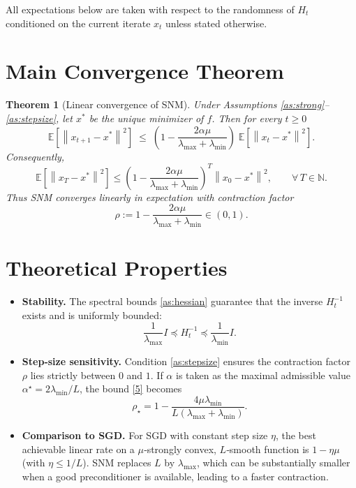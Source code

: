 \documentclass{article}
\newtheorem{theorem}{Theorem}
\newcommand{\E}{\mathbb{E}}
\newcommand{\norm}[1]{\left\|#1\right\|}
\begin{document}
All expectations below are taken with respect to the randomness of
$H_t$ conditioned on the current iterate $x_t$ unless stated otherwise.

\section*{Main Convergence Theorem}
\begin{theorem}[Linear convergence of SNM]
\label{thm:linear}
Under Assumptions \ref{as:strong}–\ref{as:stepsize},
let $x^{*}$ be the unique minimizer of $f$.  Then for every $t\ge0$
\[
\E\!\left[\norm{x_{t+1}-x^{*}}^{2}\right]
\;\le\;
\left(1-\frac{2\alpha\mu}{\lambda_{\max}+\lambda_{\min}}\right)
\;\E\!\left[\norm{x_{t}-x^{*}}^{2}\right].
\tag{5}
\]
Consequently,
\[
\E\!\left[\norm{x_{T}-x^{*}}^{2}\right]
\le
\left(1-\frac{2\alpha\mu}{\lambda_{\max}+\lambda_{\min}}\right)^{\!T}
\norm{x_{0}-x^{*}}^{2},
\qquad
\forall\,T\in\mathbb{N}.
\tag{6}
\]
Thus SNM converges \emph{linearly} in expectation with contraction factor
\[
\rho:=1-\frac{2\alpha\mu}{\lambda_{\max}+\lambda_{\min}}
\in (0,1).
\]
\end{theorem}

\section*{Theoretical Properties}
\begin{itemize}
\item \textbf{Stability.}  The spectral bounds \eqref{as:hessian} guarantee that
the inverse $H_t^{-1}$ exists and is uniformly bounded:
\[
\frac{1}{\lambda_{\max}} I \preceq H_t^{-1} \preceq \frac{1}{\lambda_{\min}} I .
\tag{7}
\]
\item \textbf{Step‑size sensitivity.}  Condition \eqref{as:stepsize}
ensures the contraction factor $\rho$ lies strictly between $0$ and $1$.
If $\alpha$ is taken as the maximal admissible value
$\alpha^{\star}=2\lambda_{\min}/L$, the bound \eqref{5} becomes
\[
\rho_{\star}=1-\frac{4\mu\lambda_{\min}}{L(\lambda_{\max}+\lambda_{\min})}.
\]
\item \textbf{Comparison to SGD.}  For SGD with constant step size
$\eta$, the best achievable linear rate on a $\mu$‑strongly convex,
$L$‑smooth function is $1-\eta\mu$ (with $\eta\le 1/L$).  SNM replaces $L$
by $\lambda_{\max}$, which can be substantially smaller when a good
preconditioner is available, leading to a faster contraction.
\end{itemize}
\end{document}

